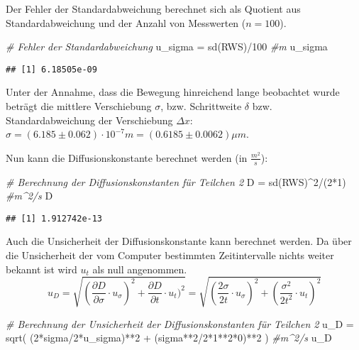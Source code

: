 \documentclass[class=article, crop=false]{standalone}
\newenvironment{Shaded}{\begin{snugshade}}{\end{snugshade}}
\newcommand{\CommentTok}[1]{\textcolor[rgb]{0.56,0.35,0.01}{\textit{#1}}}
\newcommand{\DecValTok}[1]{\textcolor[rgb]{0.00,0.00,0.81}{#1}}
\newcommand{\FunctionTok}[1]{\textcolor[rgb]{0.00,0.00,0.00}{#1}}
\newcommand{\NormalTok}[1]{#1}
\newcommand{\OtherTok}[1]{\textcolor[rgb]{0.56,0.35,0.01}{#1}}
\newcommand{\SpecialCharTok}[1]{\textcolor[rgb]{0.00,0.00,0.00}{#1}}
\begin{document}
Der Fehler der Standardabweichung berechnet sich als Quotient aus
Standardabweichung und der Anzahl von Messwerten (\(n=100\)).

\begin{Shaded}
\begin{Highlighting}[]
\CommentTok{\# Fehler der Standardabweichung}
\NormalTok{u\_sigma }\OtherTok{=} \FunctionTok{sd}\NormalTok{(RWS)}\SpecialCharTok{/}\DecValTok{100} \CommentTok{\#m}
\NormalTok{u\_sigma}
\end{Highlighting}
\end{Shaded}

\begin{verbatim}
## [1] 6.18505e-09
\end{verbatim}

Unter der Annahme, dass die Bewegung hinreichend lange beobachtet wurde
beträgt die mittlere Verschiebung \(\sigma\), bzw. Schrittweite
\(\delta\) bzw. Standardabweichung der Verschiebung \(\Delta x\):
\(\sigma = (6.185 \pm 0.062 )\cdot 10^{-7}m = (0.6185 \pm 0.0062 )\mu m\).

Nun kann die Diffusionskonstante berechnet werden (in
\(\frac{m^2}{s}\)):

\begin{Shaded}
\begin{Highlighting}[]
\CommentTok{\# Berechnung der Diffusionskonstanten für Teilchen 2}
\NormalTok{D }\OtherTok{=} \FunctionTok{sd}\NormalTok{(RWS)}\SpecialCharTok{\^{}}\DecValTok{2}\SpecialCharTok{/}\NormalTok{(}\DecValTok{2}\SpecialCharTok{*}\DecValTok{1}\NormalTok{) }\CommentTok{\#m\^{}2/s}
\NormalTok{D}
\end{Highlighting}
\end{Shaded}

\begin{verbatim}
## [1] 1.912742e-13
\end{verbatim}

Auch die Unsicherheit der Diffusionskonstante kann berechnet werden. Da
über die Unsicherheit der vom Computer bestimmten Zeitintervalle nichts
weiter bekannt ist wird \(u_t\) als null angenommen.
\[u_D = \sqrt{(\frac{\partial D}{\partial \sigma}\cdot u_{\sigma})^2 + \frac{\partial D}{\partial t}\cdot u_{t})^2}= \sqrt{(\frac{2\sigma}{2t}\cdot u_{\sigma})^2+(\frac{\sigma^2}{2t^2}\cdot u_t)^2}\]

\begin{Shaded}
\begin{Highlighting}[]
\CommentTok{\# Berechnung der Unsicherheit der Diffusionskonstanten für Teilchen 2}
\NormalTok{u\_D }\OtherTok{=} \FunctionTok{sqrt}\NormalTok{( (}\DecValTok{2}\SpecialCharTok{*}\NormalTok{sigma}\SpecialCharTok{/}\DecValTok{2}\SpecialCharTok{*}\NormalTok{u\_sigma)}\SpecialCharTok{**}\DecValTok{2} \SpecialCharTok{+}\NormalTok{ (sigma}\SpecialCharTok{**}\DecValTok{2}\SpecialCharTok{/}\DecValTok{2}\SpecialCharTok{*}\DecValTok{1}\SpecialCharTok{**}\DecValTok{2}\SpecialCharTok{*}\DecValTok{0}\NormalTok{)}\SpecialCharTok{**}\DecValTok{2}\NormalTok{ ) }\CommentTok{\#m\^{}2/s}
\NormalTok{u\_D}
\end{Highlighting}
\end{Shaded}
\end{document}
